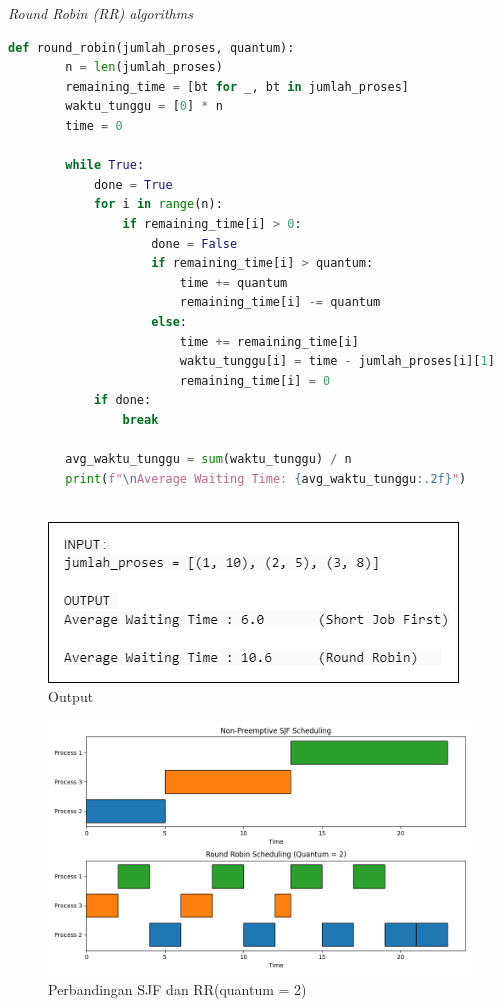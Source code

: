 \documentclass[12pt]{article}
\begin{document}
\textit{Round Robin (RR) algorithms}
\begin{lstlisting}[language=Python]
    def round_robin(jumlah_proses, quantum):
        n = len(jumlah_proses)
        remaining_time = [bt for _, bt in jumlah_proses]
        waktu_tunggu = [0] * n
        time = 0
    
        while True:
            done = True
            for i in range(n):
                if remaining_time[i] > 0:
                    done = False
                    if remaining_time[i] > quantum:
                        time += quantum
                        remaining_time[i] -= quantum
                    else:
                        time += remaining_time[i]
                        waktu_tunggu[i] = time - jumlah_proses[i][1]
                        remaining_time[i] = 0
            if done:
                break
    
        avg_waktu_tunggu = sum(waktu_tunggu) / n
        print(f"\nAverage Waiting Time: {avg_waktu_tunggu:.2f}")
    
\end{lstlisting}

\begin{figure}[H]
    \centering
    \includegraphics[width=1\linewidth]{asset/41.png}
    \caption{Output}
\end{figure}

\begin{figure}[H]
    \centering
    \includegraphics[width=1\linewidth]{asset/411.png}
    \caption{Perbandingan SJF dan RR(quantum = 2)}
\end{figure}
\end{document}
